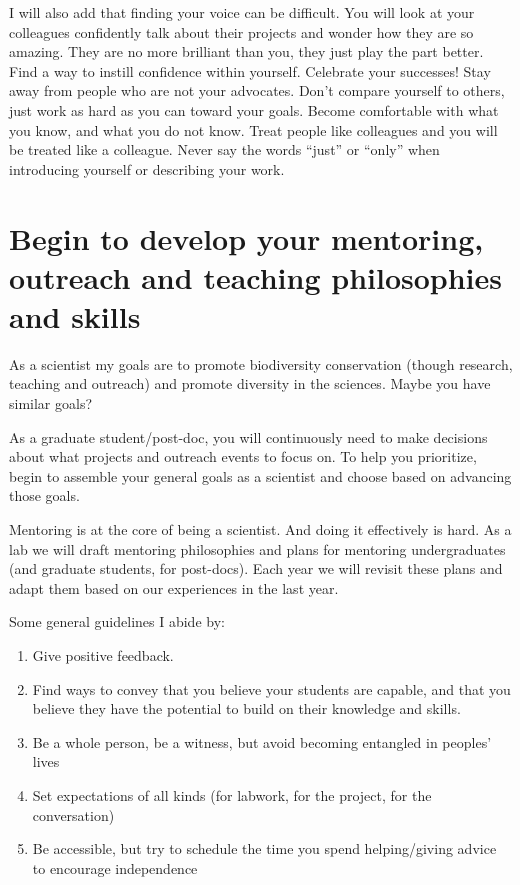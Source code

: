 \documentclass[12pt]{article}
\begin{document}
I will also add that finding your voice can be difficult. You will
look at your colleagues confidently talk about their projects and
wonder how they are so amazing. They are no more brilliant than you,
they just play the part better. Find a way to instill confidence
within yourself. Celebrate your successes! Stay away from people who
are not your advocates. Don't compare yourself to others, just work as
hard as you can toward your goals. Become comfortable with what you
know, and what you do not know. Treat people like colleagues and you
will be treated like a colleague. Never say the words ``just'' or
``only'' when introducing yourself or describing your work.

\section{Begin to develop your mentoring, outreach and teaching
  philosophies and skills}
\label{sec:skills}

As a scientist my goals are to promote biodiversity conservation
(though research, teaching and outreach) and promote diversity in the
sciences. Maybe you have similar goals?

As a graduate student/post-doc, you will continuously need to make
decisions about what projects and outreach events to focus on. To help
you prioritize, begin to assemble your general goals as a scientist
and choose based on advancing those goals.

Mentoring is at the core of being a scientist. And doing it
effectively is hard. As a lab we will draft mentoring philosophies and
plans for mentoring undergraduates (and graduate students, for
post-docs). Each year we will revisit these plans and adapt them based
on our experiences in the last year.

Some general guidelines I abide by:
\begin{enumerate}
\item Give positive feedback.
\item Find ways to convey that you believe your students are capable,
  and that you believe they have the potential to build on their
  knowledge and skills.
\item Be a whole person, be a witness, but avoid becoming entangled in
  peoples' lives
\item Set expectations of all kinds (for labwork, for the project, for
  the conversation)
\item Be accessible, but try to schedule the time you spend
  helping/giving advice to encourage independence
\end{enumerate}
\end{document}
